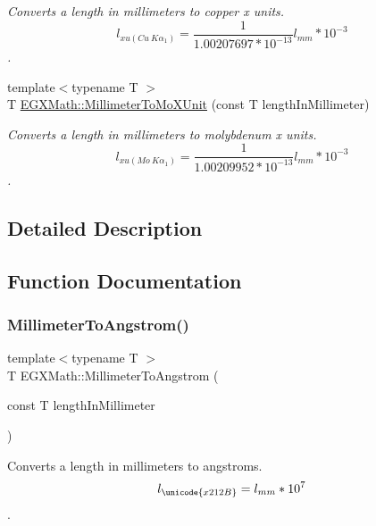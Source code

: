 \begin{DoxyCompactItemize}
\begin{DoxyCompactList}\small\item\em Converts a length in millimeters to copper x units. \[ l_{xu(Cu\ K\alpha_1)}= \frac{1}{1.00207697*10^{-13}} l_{mm} * 10^{-3}\]. \end{DoxyCompactList}\item 
{\footnotesize template$<$typename T $>$ }\\T \mbox{\hyperlink{group___e_g_x_math-_conversions-_length_conversions-_millimeter-_non-_s_i_ga1f0be98bc702f46a69579b27e05a2439}{E\+G\+X\+Math\+::\+Millimeter\+To\+Mo\+X\+Unit}} (const T length\+In\+Millimeter)
\begin{DoxyCompactList}\small\item\em Converts a length in millimeters to molybdenum x units. \[ l_{xu(Mo\ K\alpha_1)}=\frac{1}{1.00209952*10^{-13}} l_{mm} * 10^{-3}\]. \end{DoxyCompactList}\end{DoxyCompactItemize}


\subsection{Detailed Description}


\subsection{Function Documentation}
\mbox{\label{group___e_g_x_math-_conversions-_length_conversions-_millimeter-_non-_s_i_ga40e4659f4689e5be54f8e28fd8ce0008}} 
\subsubsection{\texorpdfstring{Millimeter\+To\+Angstrom()}{MillimeterToAngstrom()}}
{\footnotesize\ttfamily template$<$typename T $>$ \\
T E\+G\+X\+Math\+::\+Millimeter\+To\+Angstrom (\begin{DoxyParamCaption}\item[{const T}]{length\+In\+Millimeter }\end{DoxyParamCaption})}



Converts a length in millimeters to angstroms. \[ l_{\unicode{x212B}}=l_{mm} * 10^{7} \]. 

